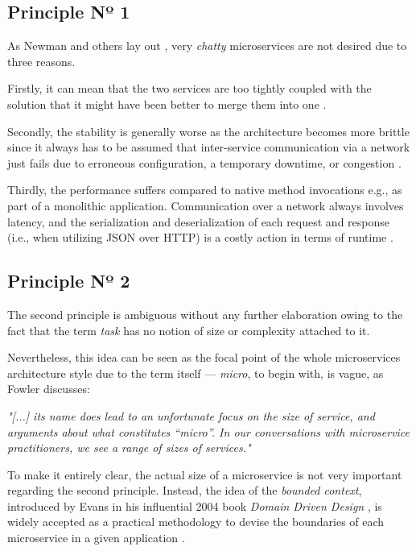 \documentclass[12pt,a4paper]{report}
\begin{document}
\subsection{Principle Nº 1}

As Newman and others lay out \cite{newman2015building, alshuqayran2016systematic},
very \textit{chatty} microservices are not desired due to three reasons.

Firstly, it can mean that the two services are too tightly coupled with the
solution that it might have been better to merge them into one
\cite{newman2015building}.

Secondly, the stability is generally worse as the architecture becomes more
brittle since it always has to be assumed that inter-service communication via
a network just fails due to erroneous configuration, a temporary downtime, or
congestion \cite{newman2015building, alshuqayran2016systematic}.

Thirdly, the performance suffers compared to native method invocations e.g., as
part of a monolithic application. Communication over a network always involves
latency, and the serialization and deserialization of each request and
response (i.e., when utilizing JSON over HTTP) is a costly action in terms of
runtime \cite{newman2015building}.


\subsection{Principle Nº 2} \label{subsect:ms-principle-2}

The second principle
is ambiguous without any further elaboration owing to the fact that the term
\textit{task} has no notion of size or complexity attached to it.

Nevertheless, this idea can be seen as the focal point of the whole
microservices architecture style due to the term itself --- \textit{micro}, to
begin with, is vague, as Fowler discusses:
\begin{displayquote}
  \emph{
  "[...] its name does lead to an unfortunate focus on the size of service,
  and arguments about what constitutes “micro”. In our conversations with
  microservice practitioners, we see a range of sizes of services."
  }~\cite{ms-fowler}
\end{displayquote}
To make it entirely clear, the actual size of a
microservice is not very important regarding the second principle. Instead, the
idea of the \textit{bounded context}, introduced by Evans in his influential
2004 book \textit{Domain Driven Design} \cite{evans2004ddd}, is widely accepted
as a practical methodology to devise the boundaries of each microservice in a
given application \cite{newman2015building, ms-fowler}.
\end{document}
